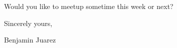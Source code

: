 Would you like to meetup sometime this week or next? 

\bigskip %

Sincerely yours,


Benjamin Juarez

% 
%  

